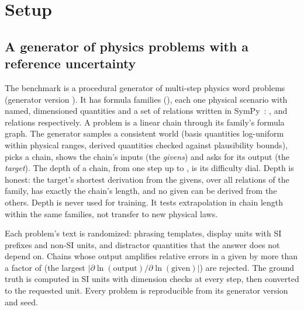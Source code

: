 \section{Setup}
\label{sec:setup}

\subsection{A generator of physics problems with a reference uncertainty}
\label{sec:generator}

The benchmark is a procedural generator of multi-step physics word problems (generator version ).
It has  formula families (), each one physical scenario with named, dimensioned
quantities and a set of relations written in SymPy~\citep{meurer2017sympy}: ,
 and  relations respectively.
A problem is a linear chain through its family's formula graph.
The generator samples a consistent world (basis quantities log-uniform within physical ranges, derived quantities
checked against plausibility bounds), picks a chain, shows the chain's inputs (the \emph{givens}) and asks for its
output (the \emph{target}).
The depth of a chain, from one step up to , is its difficulty dial.
Depth is honest: the target's shortest derivation from the givens, over all relations of the family, has exactly
the chain's length, and no given can be derived from the others.
Depth  is never used for training.
It tests extrapolation in chain length within the same families, not transfer to new physical laws.

Each problem's text is randomized: phrasing templates, display units with SI prefixes and non-SI units, and
 distractor quantities that the answer does not depend on.
Chains whose output amplifies relative errors in a given by more than a factor of 
(the largest $|\partial \ln(\text{output}) / \partial \ln(\text{given})|$) are rejected.
The ground truth is computed in SI units with dimension checks at every step, then converted to the requested unit.
Every problem is reproducible from its generator version and seed.

